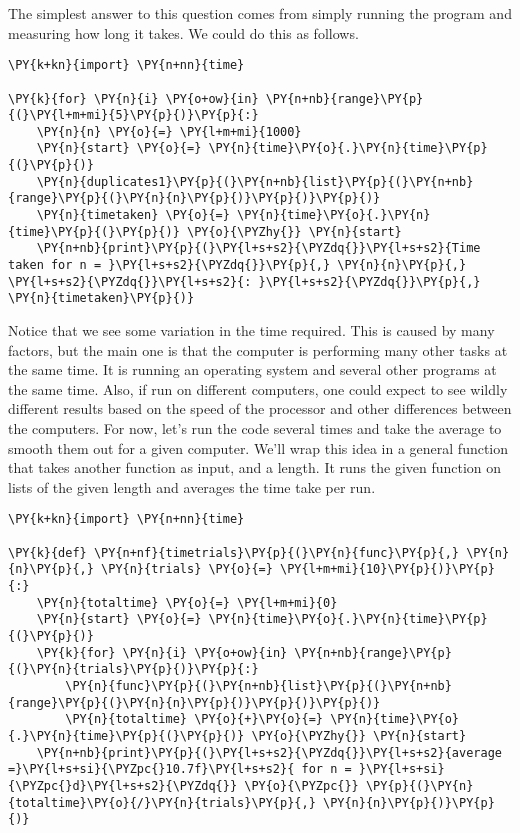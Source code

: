 The simplest answer to this question comes from simply running the program and measuring how long it takes.
We could do this as follows.

\begin{Verbatim}[commandchars=\\\{\}]
\PY{k+kn}{import} \PY{n+nn}{time}

\PY{k}{for} \PY{n}{i} \PY{o+ow}{in} \PY{n+nb}{range}\PY{p}{(}\PY{l+m+mi}{5}\PY{p}{)}\PY{p}{:}
    \PY{n}{n} \PY{o}{=} \PY{l+m+mi}{1000}
    \PY{n}{start} \PY{o}{=} \PY{n}{time}\PY{o}{.}\PY{n}{time}\PY{p}{(}\PY{p}{)}
    \PY{n}{duplicates1}\PY{p}{(}\PY{n+nb}{list}\PY{p}{(}\PY{n+nb}{range}\PY{p}{(}\PY{n}{n}\PY{p}{)}\PY{p}{)}\PY{p}{)}
    \PY{n}{timetaken} \PY{o}{=} \PY{n}{time}\PY{o}{.}\PY{n}{time}\PY{p}{(}\PY{p}{)} \PY{o}{\PYZhy{}} \PY{n}{start}
    \PY{n+nb}{print}\PY{p}{(}\PY{l+s+s2}{\PYZdq{}}\PY{l+s+s2}{Time taken for n = }\PY{l+s+s2}{\PYZdq{}}\PY{p}{,} \PY{n}{n}\PY{p}{,} \PY{l+s+s2}{\PYZdq{}}\PY{l+s+s2}{: }\PY{l+s+s2}{\PYZdq{}}\PY{p}{,} \PY{n}{timetaken}\PY{p}{)}
\end{Verbatim}





Notice that we see some variation in the time required.
This is caused by many factors, but the main one is that the computer is performing many other tasks at the same time.
It is running an operating system and several other programs at the same time.
Also, if run on different computers, one could expect to see wildly different results based on the speed of the processor and other differences between the computers.
For now, let's run the code several times and take the average to smooth them out for a given computer.
We'll wrap this idea in a general function that takes another function as input, and a length.
It runs the given function on lists of the given length and averages the time take per run.

\begin{Verbatim}[commandchars=\\\{\}]
\PY{k+kn}{import} \PY{n+nn}{time}

\PY{k}{def} \PY{n+nf}{timetrials}\PY{p}{(}\PY{n}{func}\PY{p}{,} \PY{n}{n}\PY{p}{,} \PY{n}{trials} \PY{o}{=} \PY{l+m+mi}{10}\PY{p}{)}\PY{p}{:}
    \PY{n}{totaltime} \PY{o}{=} \PY{l+m+mi}{0}
    \PY{n}{start} \PY{o}{=} \PY{n}{time}\PY{o}{.}\PY{n}{time}\PY{p}{(}\PY{p}{)}
    \PY{k}{for} \PY{n}{i} \PY{o+ow}{in} \PY{n+nb}{range}\PY{p}{(}\PY{n}{trials}\PY{p}{)}\PY{p}{:}
        \PY{n}{func}\PY{p}{(}\PY{n+nb}{list}\PY{p}{(}\PY{n+nb}{range}\PY{p}{(}\PY{n}{n}\PY{p}{)}\PY{p}{)}\PY{p}{)}
        \PY{n}{totaltime} \PY{o}{+}\PY{o}{=} \PY{n}{time}\PY{o}{.}\PY{n}{time}\PY{p}{(}\PY{p}{)} \PY{o}{\PYZhy{}} \PY{n}{start}
    \PY{n+nb}{print}\PY{p}{(}\PY{l+s+s2}{\PYZdq{}}\PY{l+s+s2}{average =}\PY{l+s+si}{\PYZpc{}10.7f}\PY{l+s+s2}{ for n = }\PY{l+s+si}{\PYZpc{}d}\PY{l+s+s2}{\PYZdq{}} \PY{o}{\PYZpc{}} \PY{p}{(}\PY{n}{totaltime}\PY{o}{/}\PY{n}{trials}\PY{p}{,} \PY{n}{n}\PY{p}{)}\PY{p}{)}
\end{Verbatim}



